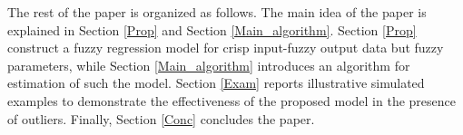 \documentclass{IJFS}
\begin{document}



The rest of the paper is organized as follows.
The main idea of the paper is explained in Section \ref{Prop} and Section \ref{Main_algorithm}.
Section \ref{Prop} construct a fuzzy regression model for crisp input-fuzzy output data but fuzzy parameters, while
Section \ref{Main_algorithm} introduces an algorithm for estimation of such the model.
Section \ref{Exam}   reports illustrative simulated examples to demonstrate the effectiveness of the proposed model in the presence of outliers.
Finally, Section \ref{Conc}  concludes the paper.
\end{document}
